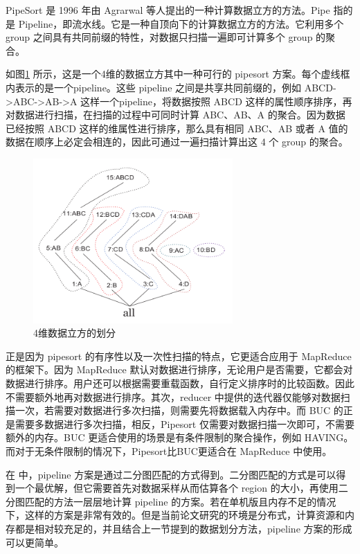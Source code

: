PipeSort\cite{agarwal1996computation} 是 1996 年由 Agrarwal 等人提出的一种计算数据立方的方法。Pipe 指的是 Pipeline，即流水线。它是一种自顶向下的计算数据立方的方法。它利用多个 group 之间具有共同前缀的特性，对数据只扫描一遍即可计算多个 group 的聚合。

如图\ref{pipesort} 所示，这是一个4维的数据立方其中一种可行的 pipesort 方案。每个虚线框内表示的是一个pipeline。这些 pipeline 之间是共享共同前缀的，例如 ABCD-\textgreater ABC-\textgreater AB-\textgreater A 这样一个pipeline，将数据按照 ABCD 这样的属性顺序排序，再对数据进行扫描，在扫描的过程中可同时计算 ABC、AB、A 的聚合。因为数据已经按照 ABCD 这样的维属性进行排序，那么具有相同 ABC、AB 或者 A 值的数据在顺序上必定会相连的，因此可通过一遍扫描计算出这 4 个 group 的聚合。

\begin{figure}[!htb]
\centering\includegraphics[width=3in]{picture/ch_terasort_mr/pipesort} 
\caption{4维数据立方的划分}\label{pipesort} 
\end{figure} 

正是因为 pipesort 的有序性以及一次性扫描的特点，它更适合应用于 MapReduce 的框架下。因为 MapReduce 默认对数据进行排序，无论用户是否需要，它都会对数据进行排序。用户还可以根据需要重载函数，自行定义排序时的比较函数。因此不需要额外地再对数据进行排序。其次，reducer 中提供的迭代器仅能够对数据扫描一次，若需要对数据进行多次扫描，则需要先将数据载入内存中。而 BUC 的正是需要多数据进行多次扫描，相反，Pipesort 仅需要对数据扫描一次即可，不需要额外的内存。BUC 更适合使用的场景是有条件限制的聚合操作，例如 HAVING。而对于无条件限制的情况下，Pipesort比BUC更适合在 MapReduce 中使用。

在 \cite{agarwal1996computation} 中，pipeline 方案是通过二分图匹配的方式得到。二分图匹配的方式是可以得到一个最优解，但它需要首先对数据采样从而估算各个 region 的大小，再使用二分图匹配的方法一层层地计算 pipeline 的方案。若在单机版且内存不足的情况下，这样的方案是非常有效的。但是当前论文研究的环境是分布式，计算资源和内存都是相对较充足的，并且结合上一节提到的数据划分方法，pipeline 方案的形成可以更简单。

